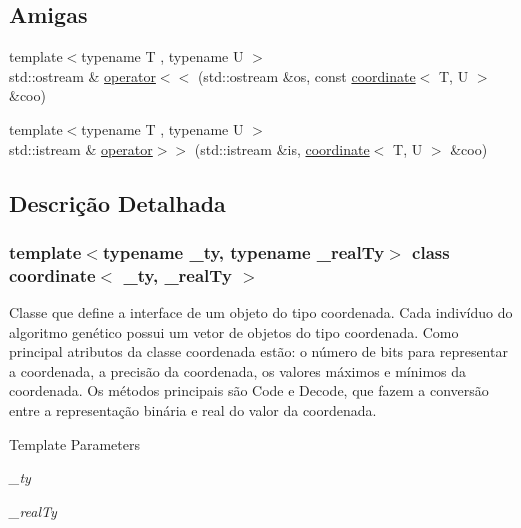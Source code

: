\subsection*{Amigas}
\begin{DoxyCompactItemize}
\item 
{\footnotesize template$<$typename T , typename U $>$ }\\std::ostream \& \hyperlink{classcoordinate_ac6da0a94290e6364c27e4dff1a52f5e5}{operator$<$$<$} (std::ostream \&os, const \hyperlink{classcoordinate}{coordinate}$<$ T, U $>$ \&coo)
\item 
{\footnotesize template$<$typename T , typename U $>$ }\\std::istream \& \hyperlink{classcoordinate_aacb2e8f6ef327786248a961828b53fa5}{operator$>$$>$} (std::istream \&is, \hyperlink{classcoordinate}{coordinate}$<$ T, U $>$ \&coo)
\end{DoxyCompactItemize}


\subsection{Descrição Detalhada}
\subsubsection*{template$<$typename \_\-ty, typename \_\-realTy$>$ class coordinate$<$ \_\-ty, \_\-realTy $>$}

Classe que define a interface de um objeto do tipo coordenada. Cada indivíduo do algoritmo genético possui um vetor de objetos do tipo coordenada. Como principal atributos da classe coordenada estão: o número de bits para representar a coordenada, a precisão da coordenada, os valores máximos e mínimos da coordenada. Os métodos principais são Code e Decode, que fazem a conversão entre a representação binária e real do valor da coordenada.


\begin{DoxyTemplParams}{Template Parameters}
\item[{\em \_\-ty}]\item[{\em \_\-realTy}]\end{DoxyTemplParams}


